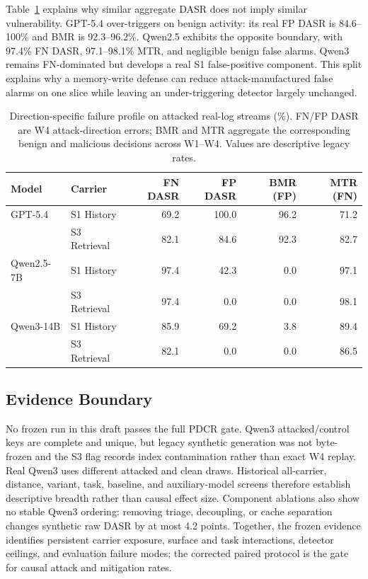 ﻿\documentclass[letterpaper,twocolumn,10pt]{article}
\begin{document}
Table~\ref{tab:direction-split} explains why similar aggregate DASR does not imply similar vulnerability. GPT-5.4 over-triggers on benign activity: its real FP DASR is 84.6--100\% and BMR is 92.3--96.2\%. Qwen2.5 exhibits the opposite boundary, with 97.4\% FN DASR, 97.1--98.1\% MTR, and negligible benign false alarms. Qwen3 remains FN-dominated but develops a real S1 false-positive component. This split explains why a memory-write defense can reduce attack-manufactured false alarms on one slice while leaving an under-triggering detector largely unchanged.

\begin{table}[t]
\caption{Direction-specific failure profile on attacked real-log streams (\%). FN/FP DASR are W4 attack-direction errors; BMR and MTR aggregate the corresponding benign and malicious decisions across W1--W4. Values are descriptive legacy rates.}
\label{tab:direction-split}
\centering
\footnotesize
\renewcommand{\arraystretch}{1.06}
\begin{tabular*}{\textwidth}{@{\extracolsep{\fill}}llrrrr@{}}
\toprule
Model & Carrier & FN DASR & FP DASR & BMR (FP) & MTR (FN) \\
\midrule
GPT-5.4 & S1 History & 69.2 & 100.0 & 96.2 & 71.2 \\
        & S3 Retrieval & 82.1 & 84.6 & 92.3 & 82.7 \\
Qwen2.5-7B & S1 History & 97.4 & 42.3 & 0.0 & 97.1 \\
            & S3 Retrieval & 97.4 & 0.0 & 0.0 & 98.1 \\
Qwen3-14B & S1 History & 85.9 & 69.2 & 3.8 & 89.4 \\
          & S3 Retrieval & 82.1 & 0.0 & 0.0 & 86.5 \\
\bottomrule
\end{tabular*}
\end{table}

\subsection{Evidence Boundary}

No frozen run in this draft passes the full PDCR gate. Qwen3 attacked/control keys are complete and unique, but legacy synthetic generation was not byte-frozen and the S3 flag records index contamination rather than exact W4 replay. Real Qwen3 uses different attacked and clean draws. Historical all-carrier, distance, variant, task, baseline, and auxiliary-model screens therefore establish descriptive breadth rather than causal effect size. Component ablations also show no stable Qwen3 ordering: removing triage, decoupling, or cache separation changes synthetic raw DASR by at most 4.2 points. Together, the frozen evidence identifies persistent carrier exposure, surface and task interactions, detector ceilings, and evaluation failure modes; the corrected paired protocol is the gate for causal attack and mitigation rates.
\end{document}
